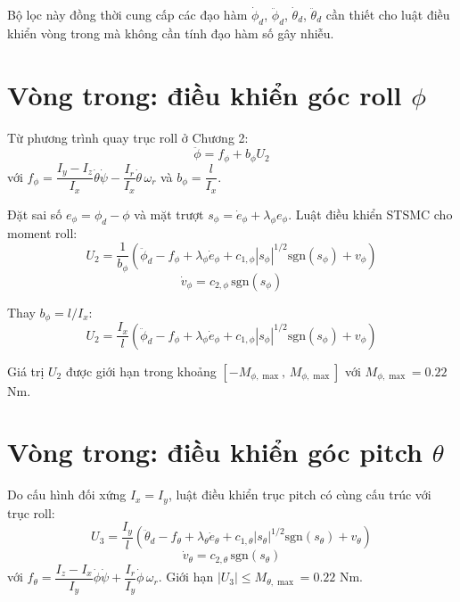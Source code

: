 \documentclass[12pt,a4paper]{report}
\begin{document}
Bộ lọc này đồng thời cung cấp các đạo hàm $\dot{\phi}_d$, $\ddot{\phi}_d$, $\dot{\theta}_d$, $\ddot{\theta}_d$ cần thiết cho luật điều khiển vòng trong mà không cần tính đạo hàm số gây nhiễu.

\section{Vòng trong: điều khiển góc roll $\phi$}
Từ phương trình quay trục roll ở Chương 2:
\begin{equation}
\ddot{\phi} = f_\phi + b_\phi U_2
\end{equation}
với $f_\phi = \dfrac{I_y - I_z}{I_x} \dot{\theta} \dot{\psi} - \dfrac{I_r}{I_x} \dot{\theta} \, \omega_r$ và $b_\phi = \dfrac{l}{I_x}$.

Đặt sai số $e_\phi = \phi_d - \phi$ và mặt trượt $s_\phi = \dot{e}_\phi + \lambda_\phi e_\phi$. Luật điều khiển STSMC cho moment roll:
\begin{equation}
U_2 = \frac{1}{b_\phi} \left( \ddot{\phi}_d - f_\phi + \lambda_\phi \dot{e}_\phi + c_{1,\phi} |s_\phi|^{1/2} \text{sgn}(s_\phi) + v_\phi \right)
\end{equation}
\begin{equation}
\dot{v}_\phi = c_{2,\phi} \, \text{sgn}(s_\phi)
\end{equation}

Thay $b_\phi = l / I_x$:
\begin{equation}
U_2 = \frac{I_x}{l} \left( \ddot{\phi}_d - f_\phi + \lambda_\phi \dot{e}_\phi + c_{1,\phi} |s_\phi|^{1/2} \text{sgn}(s_\phi) + v_\phi \right)
\end{equation}

Giá trị $U_2$ được giới hạn trong khoảng $[-M_{\phi,\max}, \, M_{\phi,\max}]$ với $M_{\phi,\max} = 0.22$ Nm.

\section{Vòng trong: điều khiển góc pitch $\theta$}
Do cấu hình đối xứng $I_x = I_y$, luật điều khiển trục pitch có cùng cấu trúc với trục roll:
\begin{equation}
U_3 = \frac{I_y}{l} \left( \ddot{\theta}_d - f_\theta + \lambda_\theta \dot{e}_\theta + c_{1,\theta} |s_\theta|^{1/2} \text{sgn}(s_\theta) + v_\theta \right)
\end{equation}
\begin{equation}
\dot{v}_\theta = c_{2,\theta} \, \text{sgn}(s_\theta)
\end{equation}
với $f_\theta = \dfrac{I_z - I_x}{I_y} \dot{\phi} \dot{\psi} + \dfrac{I_r}{I_y} \dot{\phi} \, \omega_r$. Giới hạn $|U_3| \le M_{\theta,\max} = 0.22$ Nm.
\end{document}
